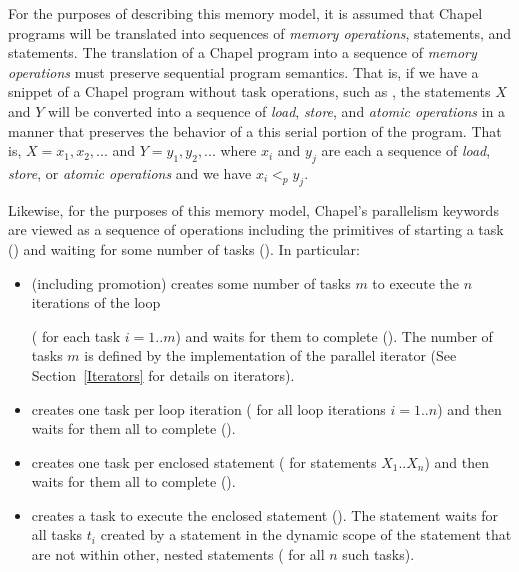 For the purposes of describing this memory model, it is assumed that Chapel
programs will be translated into sequences of \textit{memory operations},
 statements, and  statements. The translation of a
Chapel program into a sequence of \textit{memory operations} must
preserve sequential program semantics. That is, if we have a snippet
of a Chapel program without task operations, such as , the
statements $X$ and $Y$ will be converted into a sequence
of \textit{load}, \textit{store}, and \textit{atomic operations} in a
manner that preserves the behavior of a this serial portion of the
program. That is, $X=x_1,x_2,...$ and $Y=y_1,y_2,...$ where $x_i$ and
$y_j$ are each a sequence of \textit{load}, \textit{store},
or \textit{atomic operations} and we have $x_i <_p y_j$.

Likewise, for the purposes of this memory model, Chapel's parallelism
keywords are viewed as a sequence of operations including the
primitives of starting a task () and waiting for some
number of tasks (). In particular:

\begin{itemize}

  \item {} (including promotion) creates some number of
tasks $m$ to execute the $n$ iterations of the loop

( for each task $i=1$..$m$) and waits for
them to complete ().  The number of tasks $m$
is defined by the implementation of the parallel iterator (See
Section~\ref{Iterators} for details on iterators).

  \item {} creates one task per loop iteration
( for all loop iterations $i=1..n$)
and then waits for them all to complete ().

  \item {} creates one task per enclosed statement
( for statements $X_1$..$X_n$) and then
waits for them all to complete ().

  \item {} creates a task to execute the enclosed statement
().  The  statement waits for all
tasks $t_i$ created by a  statement in the dynamic scope of the
 statement that are not within other, nested 
statements ( for all $n$ such tasks).

\end{itemize}

